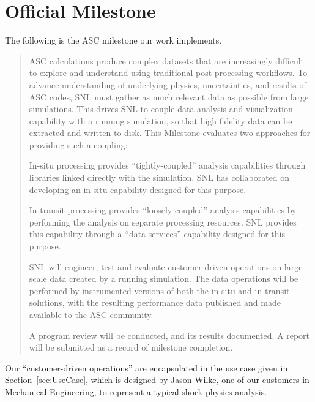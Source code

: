 \section{Official Milestone}
\label{sec:OfficialMilestone}

The following is the ASC milestone our work implements.

\begin{quotation}

ASC calculations produce complex datasets that are increasingly difficult to explore and understand using traditional post-processing workflows.  To advance understanding of underlying physics, uncertainties, and results of ASC codes, SNL must gather as much relevant data as possible from large simulations.  This drives SNL to couple data analysis and visualization capability with a running simulation, so that high fidelity data can be extracted and written to disk.  This Milestone evaluates two approaches for providing such a coupling:

\begin{enumerate}
\begin{item}
In-situ processing provides ``tightly-coupled'' analysis capabilities through libraries linked directly with the simulation.  SNL has collaborated on developing an in-situ capability designed for this purpose.
\label{tightly-coupled-approach}
\end{item}
\begin{item}
In-transit processing provides ``loosely-coupled'' analysis capabilities by performing the analysis on separate processing resources.  SNL provides this capability through a ``data services'' capability designed for this purpose.
\label{loosely-coupled-approach}
\end{item}
\end{enumerate}

SNL will engineer, test and evaluate customer-driven operations on large-scale data created by a running simulation.  The data operations will be performed by instrumented versions of both the in-situ and in-transit solutions, with the resulting performance data published and made available to the ASC community.

A program review will be conducted, and its results documented.  A report will be submitted as a record of milestone completion.

\end{quotation}

Our ``customer-driven operations'' are encapsulated in the use case given
in Section~\ref{sec:UseCase}, which is designed by Jason Wilke, one of our
customers in Mechanical Engineering, to represent a typical shock physics
analysis.

